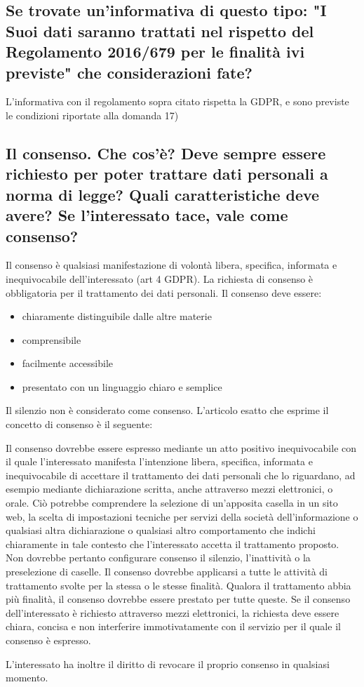\subsection{Se trovate un'informativa di questo tipo: "I Suoi dati saranno trattati nel rispetto del Regolamento
2016/679 per le finalità ivi previste" che considerazioni fate?}

L'informativa con il regolamento sopra citato rispetta la GDPR, e sono previste le condizioni riportate alla domanda 17)

\subsection{Il consenso. Che cos’è? Deve sempre essere richiesto per poter trattare dati personali a norma
di legge? Quali caratteristiche deve avere? Se l'interessato tace, vale come consenso?}

Il consenso è qualsiasi manifestazione di volontà libera, specifica, informata e inequivocabile dell'interessato (art 4 GDPR).
\newline
La richiesta di consenso è obbligatoria per il trattamento dei dati personali.
Il consenso deve essere:
\begin{itemize}
    \item chiaramente distinguibile dalle altre materie
    \item comprensibile
    \item facilmente accessibile
    \item presentato con un linguaggio chiaro e semplice
\end{itemize}
Il silenzio non è considerato come consenso.
\newline
L'articolo esatto che esprime il concetto di consenso è il seguente:
\begin{mdframed}
    [backgroundcolor=blue!20]Il consenso dovrebbe essere espresso mediante un atto positivo inequivocabile con il quale l’interessato manifesta l’intenzione libera, specifica, informata e inequivocabile di accettare il trattamento dei dati personali che lo riguardano, ad esempio mediante dichiarazione scritta, anche attraverso mezzi elettronici, o orale. Ciò potrebbe comprendere la selezione di un’apposita casella in un sito web, la scelta di impostazioni tecniche per servizi della società dell’informazione o qualsiasi altra dichiarazione o qualsiasi altro comportamento che indichi chiaramente in tale contesto che l’interessato accetta il trattamento proposto. Non dovrebbe pertanto configurare consenso il silenzio, l’inattività o la preselezione di caselle. Il consenso dovrebbe applicarsi a tutte le attività di trattamento svolte per la stessa o le stesse finalità. Qualora il trattamento abbia più finalità, il consenso dovrebbe essere prestato per tutte queste. Se il consenso dell’interessato è richiesto attraverso mezzi elettronici, la richiesta deve essere chiara, concisa e non interferire immotivatamente con il servizio per il quale il consenso è espresso.
\end{mdframed}
L'interessato ha inoltre il diritto di revocare il proprio consenso in qualsiasi momento.
